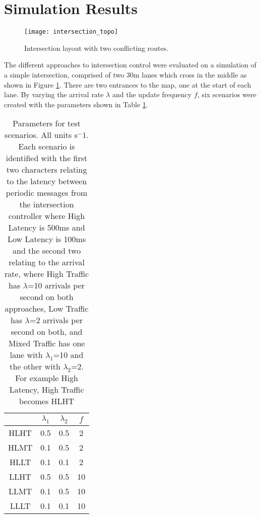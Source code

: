 \section{Simulation Results}

\begin{figure}[ht]
	\centering
	\texttt{[image: intersection\_topo]}
	\caption{Intersection layout with two conflicting routes.}
	\label{fig:intersection_topo}
\end{figure}

The different approaches to intersection control were evaluated on a simulation of a simple intersection, comprised of two 30m lanes which cross in the middle as shown in Figure \ref{fig:intersection_topo}. There are two entrances to the map, one at the start of each lane. By varying the arrival rate $\lambda$ and the update frequency $f$, six scenarios were created with the parameters shown in Table \ref{tab:params}.
\begin{table}
	\begin{tabular}{|c|c|c|c|}
		\hline
		& $\lambda_1$ & $\lambda_2$ & $f$ \\
		\hline
		HLHT & 0.5 & 0.5 & 2 \\
		HLMT & 0.1 & 0.5 & 2 \\
		HLLT & 0.1 & 0.1 & 2 \\
		LLHT & 0.5 & 0.5 & 10 \\
		LLMT & 0.1 & 0.5 & 10 \\
		LLLT & 0.1 & 0.1 & 10 \\
		\hline
	\end{tabular}
	\label{tab:params}
	\caption{Parameters for test scenarios. All units s$^-1$. Each scenario is identified with the first two characters relating to the latency between periodic messages from the intersection controller where High Latency is 500ms and  Low Latency is 100ms and the second two relating to the arrival rate, where High Traffic has $\lambda$=10 arrivals per second on both approaches, Low Traffic has $\lambda$=2 arrivals per second on both, and Mixed Traffic has one lane with $\lambda_1$=10 and the other with $\lambda_2$=2. For example High Latency, High Traffic becomes HLHT}
\end{table}

